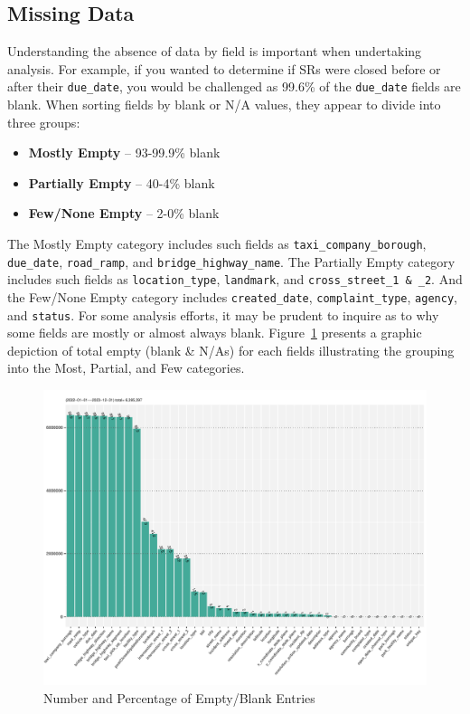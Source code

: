 \documentclass[linenumber]{jdsart}
\begin{document}
\subsection{Missing Data}
\label{sec:blanks}
Understanding the absence of data by field is important 
when undertaking analysis. For example, if you wanted to 
determine if SRs were closed before or after their
\texttt{due\_date}, you would be challenged as 99.6\% of the
\texttt{due\_date} fields are blank. When sorting fields by
blank or N/A values, they appear to divide into three groups:

\begin{itemize}
    \item \textbf{Mostly Empty} -- 93-99.9\% blank 
    \item \textbf{Partially Empty} -- 40-4\% blank
    \item \textbf{Few/None Empty} -- 2-0\% blank
\end{itemize}


The Mostly Empty category includes such fields as
\texttt{taxi\_company\_borough}, \texttt{due\_date},
\texttt{road\_ramp}, and \texttt{bridge\_highway\_name}.
The Partially Empty category includes such fields as
\texttt{location\_type}, \texttt{landmark}, 
and \texttt{cross\_street\_1 \& \_2}. And the Few/None Empty category
 includes \texttt{created\_date}, \texttt{complaint\_type},
\texttt{agency}, and \texttt{status}. For some analysis efforts, it may be
prudent to inquire as to why some fields are mostly or almost always blank.
Figure~\ref{fig:blank_fields} presents a graphic 
depiction of total empty (blank \& N/As) for each fields illustrating
the grouping into the Most, Partial, and Few categories.

\begin{figure}[tbp]
	\centering
  	\includegraphics[width=\textwidth]{BlankFields.pdf}
	\caption{Number and Percentage of Empty/Blank Entries}
	\label{fig:blank_fields}
\end{figure}
\end{document}
